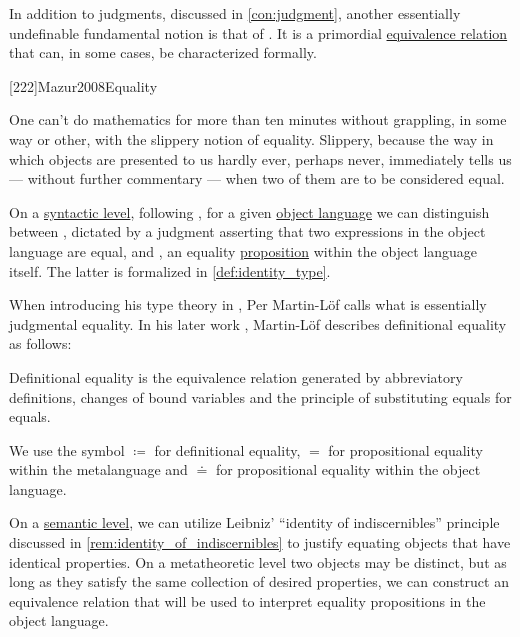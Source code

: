 \begin{concept}\label{con:equality}
  In addition to judgments, discussed in \cref{con:judgment}, another essentially undefinable fundamental notion is that of . It is a primordial \hyperref[def:equivalence_relation]{equivalence relation} that can, in some cases, be characterized formally.

  [222]{Mazur2008Equality}
  \begin{displayquote}
    One can't do mathematics for more than ten minutes without grappling, in some way or other, with the slippery notion of equality. Slippery, because the way in which objects are presented to us hardly ever, perhaps never, immediately tells us --- without further commentary --- when two of them are to be considered equal.
  \end{displayquote}

  On a \hyperref[con:syntax_semantics_duality]{syntactic level}, following \cite[19]{UnivalentFoundationsProgram2013HoTT}, for a given \hyperref[con:metalogic]{object language} we can distinguish between , dictated by a judgment asserting that two expressions in the object language are equal, and , an equality \hyperref[con:proposition]{proposition} within the object language itself. The latter is formalized in \cref{def:identity_type}.

  When introducing his type theory in \cite[85]{MartinLöf1984IntuitionisticTypeTheory}, Per Martin-L\"of calls  what is essentially judgmental equality. In his later work \cite[40]{MartinLöf1984IntuitionisticTypeTheory}, Martin-L\"of describes definitional equality as follows:
  \begin{displayquote}
    Definitional equality is the equivalence relation generated by abbreviatory definitions, changes of bound variables and the principle of substituting equals for equals.
  \end{displayquote}

  We use the symbol \( {\coloneqq} \) for definitional equality, \( {=} \) for propositional equality within the metalanguage and \( {\doteq} \) for propositional equality within the object language.

  On a \hyperref[con:syntax_semantics_duality]{semantic level}, we can utilize Leibniz' \enquote{identity of indiscernibles} principle discussed in \cref{rem:identity_of_indiscernibles} to justify equating objects that have identical properties. On a metatheoretic level two objects may be distinct, but as long as they satisfy the same collection of desired properties, we can construct an equivalence relation that will be used to interpret equality propositions in the object language.
\end{concept}

